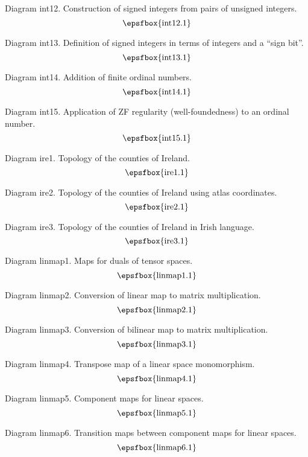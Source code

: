 Diagram int12. Construction of signed integers from pairs of unsigned integers.
$$
\centerline{\epsfbox{int12.1}}
$$

Diagram int13. Definition of signed integers in terms of integers and a ``sign
bit''.
$$
\centerline{\epsfbox{int13.1}}
$$

Diagram int14. Addition of finite ordinal numbers.
$$
\centerline{\epsfbox{int14.1}}
$$

\filleject

Diagram int15. Application of ZF regularity (well-foundedness) to an ordinal
number.
$$
\centerline{\epsfbox{int15.1}}
$$

\secteject
\edef\SECTire{\the\pageno}

Diagram ire1. Topology of the counties of Ireland.
$$
\centerline{\epsfbox{ire1.1}}
$$

Diagram ire2. Topology of the counties of Ireland using atlas coordinates.
$$
\centerline{\epsfbox{ire2.1}}
$$

\filleject

Diagram ire3. Topology of the counties of Ireland in Irish language.
$$
\centerline{\epsfbox{ire3.1}}
$$

\secteject
\edef\SECTlinmap{\the\pageno}

Diagram linmap1. Maps for duals of tensor spaces.
$$
\centerline{\epsfbox{linmap1.1}}
$$

Diagram linmap2. Conversion of linear map to matrix multiplication.
$$
\centerline{\epsfbox{linmap2.1}}
$$

Diagram linmap3. Conversion of bilinear map to matrix multiplication.
$$
\centerline{\epsfbox{linmap3.1}}
$$

\filleject

Diagram linmap4. Transpose map of a linear space monomorphism.
$$
\centerline{\epsfbox{linmap4.1}}
$$

Diagram linmap5. Component maps for linear spaces.
$$
\centerline{\epsfbox{linmap5.1}}
$$

Diagram linmap6. Transition maps between component maps for linear spaces.
$$
\centerline{\epsfbox{linmap6.1}}
$$

